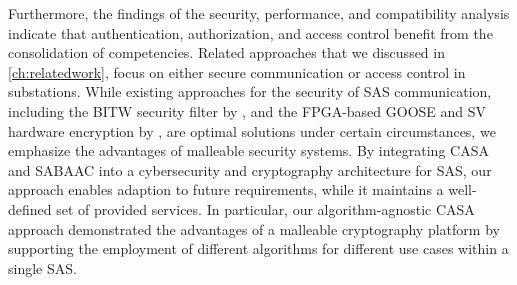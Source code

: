 Furthermore, the findings of the security, performance, and compatibility analysis indicate that authentication, authorization, and access control benefit from the consolidation of competencies.
Related approaches that we discussed in \autoref{ch:relatedwork}, focus on either secure communication or access control in substations.
While existing approaches for the security of SAS communication, including the BITW security filter by \citeauthor{Ishchenko2018} \cite{Ishchenko2018}, and the FPGA-based GOOSE and SV hardware encryption by \citeauthor{Rodriguez2021} \cite{Rodriguez2021}, are optimal solutions under certain circumstances, we emphasize the advantages of malleable security systems.
By integrating CASA and SABAAC into a cybersecurity and cryptography architecture for SAS, our approach enables adaption to future requirements, while it maintains a well-defined set of provided services.
In particular, our algorithm-agnostic CASA approach demonstrated the advantages of a malleable cryptography platform by supporting the employment of different algorithms for different use cases within a single SAS.
